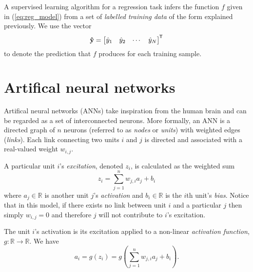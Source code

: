 \begin{definition}
    A supervised learning algorithm for a regression task infers the function $f$ given in (\ref{eq:reg_model}) from a set of \textit{labelled training data} of the form explained previously. 
    We use the vector
    \begin{equation}
        \label{eq:sup_learn_prediction}
        \mathbf{\hat{y}} = \begin{bmatrix}
            \hat{y}_1 & \hat{y}_2 & \cdots & \hat{y}_N
        \end{bmatrix}^{\mkern-1.5mu\mathsf{T}}
    \end{equation}
    to denote the prediction that $f$ produces for each training sample.
\end{definition}

\section{Artifical neural networks}
\label{sec:ann}
Artifical neural networks (ANNs) take inspiration from the human brain and can be regarded as a set of interconnected neurons. 
More formally, an ANN is a directed graph of $n$ neurons (referred to as \textit{nodes} or \textit{units}) with weighted edges (\textit{links}).
Each link connecting two units $i$ and $j$ is directed and associated with a real-valued weight $w_{i,j}$. 

A particular unit $i$'s \textit{excitation}, denoted $z_i$, is calculated as the weighted sum
\begin{equation}
    z_i = \sum_{j=1}^n{w_{j,i} a_j} + b_i
\end{equation}
where $a_j \in \mathbb{R}$ is another unit $j$'s \textit{activation} and $b_i \in \mathbb{R}$ is the $i$th unit's \textit{bias}.
Notice that in this model, if there exists no link between unit $i$ and a particular $j$ then simply $w_{i,j}=0$ and therefore $j$ will not contribute to $i$'s excitation. 

The unit $i$'s activation is its excitation applied to a non-linear \textit{activation function}, $g: \mathbb{R} \rightarrow \mathbb{R}$. We have
\begin{equation}
    \label{eq:ann_activation}
    a_i = g\left(z_i\right) = g\left(\sum_{j=1}^n{w_{j,i} a_j} + b_i\right).
\end{equation}

